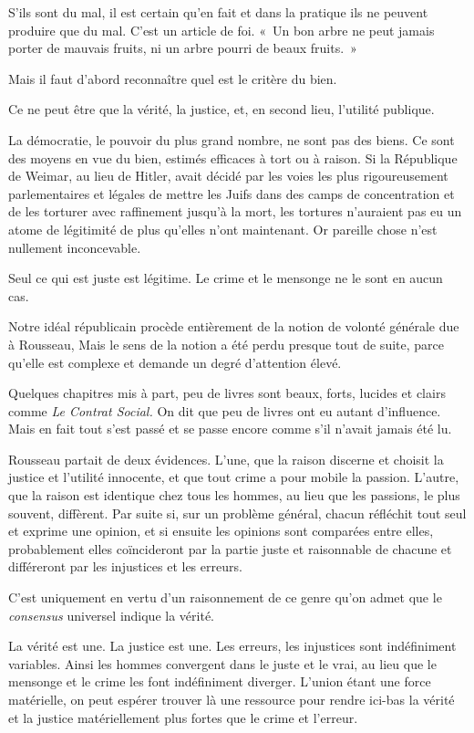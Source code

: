 \documentclass[french,twoside]{book} %
\begin{document}
S’ils sont du mal, il est certain qu’en fait et dans la pratique ils ne peuvent produire que du mal. C’est un article de foi. « Un bon arbre ne peut jamais porter de mauvais fruits, ni un arbre pourri de beaux fruits. »\par
Mais il faut d’abord reconnaître quel est le critère du bien.\par
Ce ne peut être que la vérité, la justice, et, en second lieu, l’utilité publique.\par
La démocratie, le pouvoir du plus grand nombre, ne sont pas des biens. Ce sont des moyens en vue du bien, estimés efficaces à tort ou à raison. Si la République de Weimar, au lieu de Hitler, avait décidé par les voies les plus rigoureusement parlementaires et légales de mettre les Juifs dans des camps de concentration et de les torturer avec raffinement jusqu’à la mort, les tortures n’auraient pas eu un atome de légitimité de plus qu’elles n’ont maintenant. Or pareille chose n’est nullement inconcevable.\par
Seul ce qui est juste est légitime. Le crime et le mensonge ne le sont en aucun cas.\par
Notre idéal républicain procède entièrement de la notion de volonté générale due à Rousseau, Mais le sens de la notion a été perdu presque tout de suite, parce qu’elle est complexe et demande un degré d’attention élevé.\par
Quelques chapitres mis à part, peu de livres sont beaux, forts, lucides et clairs comme \emph{Le Contrat Social.} On dit que peu de livres ont eu autant d’influence. Mais en fait tout s’est passé et se passe encore comme s’il n’avait jamais été lu.\par
Rousseau partait de deux évidences. L’une, que la raison discerne et choisit la justice et l’utilité innocente, et que tout crime a pour mobile la passion. L’autre, que la raison est identique chez tous les hommes, au lieu que les passions, le plus souvent, diffèrent. Par suite si, sur un problème général, chacun réfléchit tout seul et exprime une opinion, et si ensuite les opinions sont comparées entre elles, probablement elles coïncideront par la partie juste et raisonnable de chacune et différeront par les injustices et les erreurs.\par
C’est uniquement en vertu d’un raisonnement de ce genre qu’on admet que le \emph{consensus} universel indique la vérité.\par
La vérité est une. La justice est une. Les erreurs, les injustices sont indéfiniment variables. Ainsi les hommes convergent dans le juste et le vrai, au lieu que le mensonge et le crime les font indéfiniment diverger. L’union étant une force matérielle, on peut espérer trouver là une ressource pour rendre ici-bas la vérité et la justice matériellement plus fortes que le crime et l’erreur.\par
\end{document}
